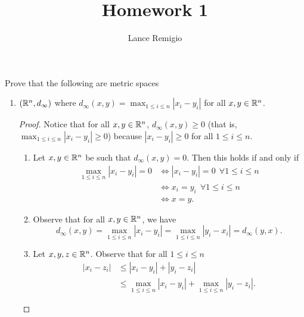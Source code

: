\documentclass[a4paper]{article}
\title{Homework 1}
\author{Lance Remigio}
\begin{document}
\maketitle
{}
\rhead{\thepage}
\begin{problem}
   Prove that the following are metric spaces 
   \begin{enumerate}
       \item[(i)] \( (\mathbb{R}^{n}, {d}_{\infty })  \) where \( {d}_{\infty }(x,y) = \max_{1 \leq i \leq n} | {x}_{i} - {y}_{i} |  \) for all \( x,y \in \mathbb{R}^{n} \). 
           \begin{proof}
               Notice that for all \( x,y \in \mathbb{R}^{n} \), \( {d}_{\infty }(x,y) \geq 0  \) (that is, \( \max_{1 \leq i \leq n } | {x}_{i} - {y}_{i} |  \geq 0  \)) because \( | {x}_{i} - {y}_{i} |  \geq 0  \) for all \( 1 \leq i \leq n  \). 
            \begin{enumerate}
                \item[(I)] Let \( x,y \in \mathbb{R}^{n} \) be such that \( {d}_{\infty }(x,y) = 0  \). Then this holds if and only if
                    \begin{align*}
                        \max_{1 \leq i \leq n } | {x}_{i} - {y}_{i} | = 0  &\iff | {x}_{i} - {y}_{i} |  = 0  \ \ \forall 1 \leq i \leq n  \\
                                                                           &\iff {x}_{i} = {y}_{i} \ \ \forall  1 \leq i \leq n \\
                                                                           &\iff x = y.                    
                    \end{align*}
            \item[(II)] Observe that for all \( x,y \in \mathbb{R}^{n} \), we have 
                \[  {d}_{\infty }(x,y) = \max_{1 \leq i \leq n} | {x}_{i} - {y}_{i} |  = \max_{1 \leq i \leq n } | {y}_{i} - {x}_{i} |  = {d}_{\infty }(y,x). \]
            \item[(III)] Let \( x,y,z \in \mathbb{R}^{n} \). Observe that for all \( 1 \leq i \leq n  \) 
                \begin{align*}
                    | {x}_{i} - {z}_{i} | &\leq | {x}_{i} - {y}_{i} | + | {y}_{i} - {z}_{i} |   \\
                                          &\leq \max_{1 \leq i \leq n } | {x}_{i} - {y}_{i} |  + \max_{1 \leq i \leq n} | {y}_{i} - {z}_{i} |. 
                \end{align*}

\end{enumerate}
\end{proof}
\end{enumerate}
\end{problem}
\end{document}
